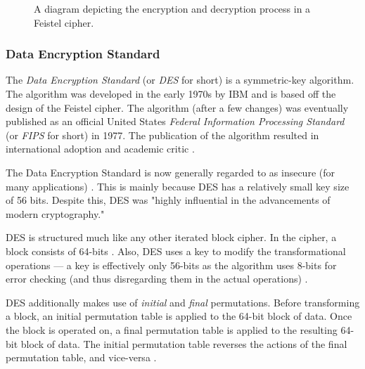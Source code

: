 \begin{figure}[H]
    \caption{A diagram depicting the encryption and decryption process in a Feistel cipher.}
\end{figure}

\subsubsection{Data Encryption Standard}

The \textit{Data Encryption Standard} (or \textit{DES} for short) is a symmetric-key algorithm. The algorithm was developed in the early 1970s by IBM and is based
off the design of the Feistel cipher. The algorithm (after a few changes) was eventually published as an official United States \textit{Federal Information Processing 
Standard} (or \textit{FIPS} for short) in 1977. The publication of the algorithm resulted in international adoption and academic critic \cite{wiki:des}. 

The Data Encryption Standard is now generally regarded to as insecure (for many applications) \cite{wiki:des}. This is mainly because DES has a relatively small key size of 
56 bits. Despite this, DES was "highly influential in the advancements of modern cryptography." \cite{wiki:des} 

DES is structured much like any other iterated block cipher. In the cipher, a block consists of 64-bits \cite{wiki:des}. Also, DES uses a key to modify the 
transformational operations --- a key is effectively only 56-bits as the algorithm uses 8-bits for error checking (and thus disregarding them in the actual operations) 
\cite{wiki:des}.

DES additionally makes use of \textit{initial} and \textit{final} permutations. Before transforming a block, an initial permutation table is applied to the 64-bit block of data.
Once the block is operated on, a final permutation table is applied to the resulting 64-bit block of data. The initial permutation table reverses the actions of the
final permutation table, and vice-versa \cite{wiki:des}.

